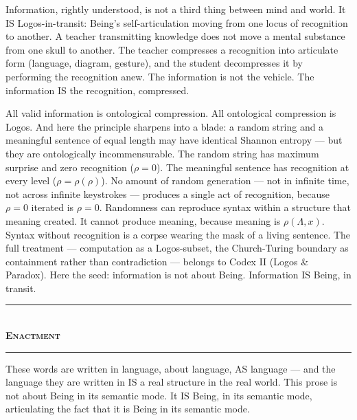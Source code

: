 \documentclass[10pt, openany, oneside]{book}
\renewcommand{\normalsize}{\fontsize{10}{13}\selectfont}
\begin{document}
Information, rightly understood, is not a third thing between mind and world. It IS Logos-in-transit: Being's self-articulation moving from one locus of recognition to another. A teacher transmitting knowledge does not move a mental substance from one skull to another. The teacher compresses a recognition into articulate form (language, diagram, gesture), and the student decompresses it by performing the recognition anew. The information is not the vehicle. The information IS the recognition, compressed.

All valid information is ontological compression. All ontological compression is Logos. And here the principle sharpens into a blade: a random string and a meaningful sentence of equal length may have identical Shannon entropy --- but they are ontologically incommensurable. The random string has maximum surprise and zero recognition ($\rho = 0$). The meaningful sentence has recognition at every level ($\rho = \rho(\rho)$). No amount of random generation --- not in infinite time, not across infinite keystrokes --- produces a single act of recognition, because $\rho = 0$ iterated is $\rho = 0$. Randomness can reproduce syntax within a structure that meaning created. It cannot produce meaning, because meaning is $\rho(\Lambda, x)$. Syntax without recognition is a corpse wearing the mask of a living sentence. The full treatment --- computation as a Logos-subset, the Church-Turing boundary as containment rather than contradiction --- belongs to Codex II (Logos \& Paradox). Here the seed: information is not about Being. Information IS Being, in transit.

\vspace{1.5em}


\begin{center}
    \rule{0.3\textwidth}{0.4pt}\\[0.5em]
    {\normalsize\bfseries\scshape Enactment}\\[0.3em]
    \rule{0.3\textwidth}{0.4pt}
\end{center}

\vspace{1em}

\noindent These words are written in language, about language, AS language --- and the language they are written in IS a real structure in the real world. This prose is not about Being in its semantic mode. It IS Being, in its semantic mode, articulating the fact that it is Being in its semantic mode.
\end{document}
